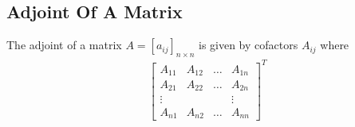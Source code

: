 \documentclass[a4paper]{article}
\theoremstyle{plain}
\theoremstyle{definition}
\newtheorem{defn}{Definition}[section]
\theoremstyle{remark}
\begin{document}
\subsection{Adjoint Of A Matrix}
\begin{tcolorbox}[colback=black!3!white,colframe=black!60!white,title=\begin{defn}Adjoint of a matrix \label{Adjoint of a matrix}\end{defn}]
The adjoint of a matrix $A = [a_{ij}]_{n \times n}$ is given by cofactors $A_{ij}$ where
\begin{align}
	\begin{bmatrix} A_{11} & A_{12} & \ldots & A_{1n} \\
	A_{21} & A_{22} & \ldots & A_{2n} \\
\vdots & & & \vdots \\
A_{n1} & A_{n2} & \ldots & A_{nn}
\end{bmatrix}^{T}
\end{align}
\end{tcolorbox}
\end{document}
